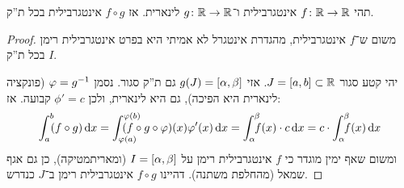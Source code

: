 \documentclass[]{../../../../tex/classes/homework}
\newcommand\Is{\dequad \ }
\begin{document}
	\section{}
	תהי $f \colon \mathbb{R} \to \mathbb{R}$ אינטגרבילית ו־$g \colon \mathbb{R} \to \mathbb{R}$ לינארית. אז $f \circ g$ אינטגרבילית בכל ת''ק. \begin{proof}
		משום ש־$f$ אינטגרבילית, מהגדרת אינטגרל לא אמיתי היא בפרט אינטגרבילית רימן בכל ת''ק $I$. 
		
		יהי קטע סגור $J = [a, b] \subset \mathbb{R}$. אזי $g(J) = [\alpha, \beta]$ גם ת''ק סגור. נסמן $\varphi = g^{-1}$ (פונקציה לינארית היא הפיכה), גם היא לינארית, ולכן $\phi' = c$ קבועה. אז:
		\[ \int^{b}_a \Is\ (f \circ g)\dx= \int^{\phi(b)}_{\phi(a)}\dequadd \ (f \circ g \circ \phi)(x)\phi'(x) \dx = \int^{\bg}_\ag \Is f(x) \cdot c \dx = c \cdot \int^{\bg}_\ag \Is f(x)\dx \]
		ומשום שאף ימין מוגדר כי $f$ אינטגרבילית רימן על $I = [\alpha, \beta]$ (ומאריתמטיקה), כן גם אגף שמאל (מהחלפת משתנה). דהיינו $f \circ g$ אינטגרבילית רימן ב־$J$ כנדרש. 
	\end{proof}
	
	
	
	\ndoc
\end{document}
